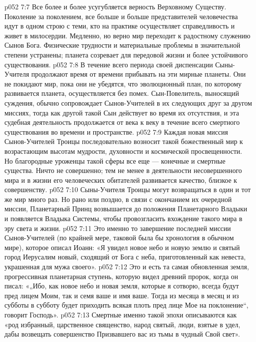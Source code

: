 \vs p052 7:7 \pc Все более и более усугубляется верность Верховному Существу. Поколение за поколением, все больше и больше представителей человечества идут в одном строю с теми, кто на практике осуществляет справедливость и живет в милосердии. Медленно, но верно мир переходит к радостному служению Сынов Бога. Физические трудности и материальные проблемы в значительной степени устранены; планета созревает для передовой жизни и более устойчивого существования.
\vs p052 7:8 \pc В течение всего периода своей диспенсации Сыны\hyp{}Учителя продолжают время от времени прибывать на эти мирные планеты. Они не покидают мир, пока они не убедятся, что эволюционный план, по которому развивается планета, осуществляется без помех. Сын\hyp{}Повелитель, выносящий суждения, обычно сопровождает Сынов\hyp{}Учителей в их следующих друг за другом миссиях, тогда как другой такой Сын действует во время их отсутствия, и эта судебная деятельность продолжается от века к веку в течение всего смертного существования во времени и пространстве.
\vs p052 7:9 Каждая новая миссия Сынов\hyp{}Учителей Троицы последовательно возносит такой божественный мир к возрастающим высотам мудрости, духовности и космической просвещенности. Но благородные уроженцы такой сферы все еще --- конечные и смертные существа. Ничто не совершенно; тем не менее в деятельности несовершенного мира и в жизни его человеческих обитателей развивается качество, близкое к совершенству.
\vs p052 7:10 \pc Сыны\hyp{}Учителя Троицы могут возвращаться в один и тот же мир много раз. Но рано или поздно, в связи с окончанием их очередной миссии, Планетарный Принц возвышается до положения Планетарного Владыки и появляется Владыка Системы, чтобы провозгласить вхождение такого мира в эру света и жизни.
\vs p052 7:11 Это именно то завершение последней миссии Сынов\hyp{}Учителей (по крайней мере, таковой была бы хронология в обычном мире), которое описал Иоанн: «Я увидел новое небо и новую землю и святый город Иерусалим новый, сходящий от Бога с неба, приготовленный как невеста, украшенная для мужа своего».
\vs p052 7:12 Это и есть та самая обновленная земля, прогрессивная планетарная ступень, которую видел древний пророк, когда он писал: «„Ибо, как новое небо и новая земля, которые я сотворю, всегда будут пред лицем Моим, так и семя ваше и имя ваше. Тогда из месяца в месяц и из субботы в субботу будет приходить всякая плоть пред лице Мое на поклонение“, говорит Господь».
\vs p052 7:13 Смертные именно такой эпохи описываются как «род избранный, царственное священство, народ святый, люди, взятые в удел, дабы возвещать совершенство Призвавшего вас из тьмы в чудный Свой свет».
